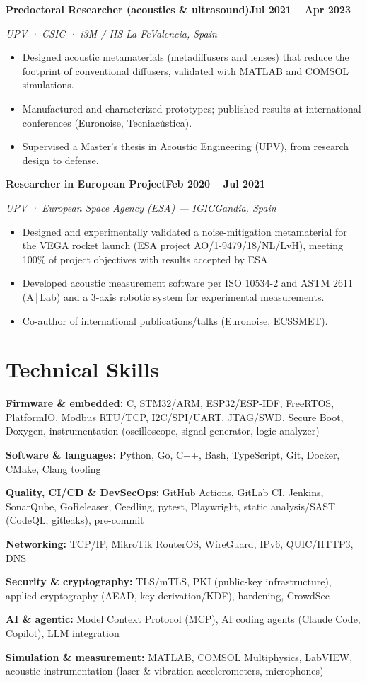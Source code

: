 \documentclass[11pt,a4paper]{article}
\let\jmrpsection\section
\renewcommand{\section}[1]{\needspace{4\baselineskip}\jmrpsection{#1}}
\newcommand{\cventry}[4]{%
  \textbf{#1}\hfill\textbf{#4}\par
  {\color{muted}\textit{#2}\hfill\textit{#3}}\par
  \vspace{2pt}
}
\newcommand{\cvskill}[2]{\textbf{#1:} #2\par\vspace{2pt}}
\begin{document}
\cventry{Predoctoral Researcher (acoustics \& ultrasound)}{UPV · CSIC · i3M / IIS La Fe}{Valencia, Spain}{Jul 2021 – Apr 2023}
\begin{itemize}
  \item Designed acoustic metamaterials (metadiffusers and lenses) that reduce the footprint of conventional diffusers, validated with MATLAB and COMSOL simulations.
  \item Manufactured and characterized prototypes; published results at international conferences (Euronoise, Tecniacústica).
  \item Supervised a Master's thesis in Acoustic Engineering (UPV), from research design to defense.
\end{itemize}\vspace{2pt}

\cventry{Researcher in European Project}{UPV · European Space Agency (ESA) — IGIC}{Gandía, Spain}{Feb 2020 – Jul 2021}
\begin{itemize}
  \item Designed and experimentally validated a noise-mitigation metamaterial for the VEGA rocket launch (ESA project AO/1-9479/18/NL/LvH), meeting 100\% of project objectives with results accepted by ESA.
  \item Developed acoustic measurement software per ISO 10534-2 and ASTM 2611 (\href{https://github.com/jmrplens/A-Lab}{A\,|\,Lab}) and a 3-axis robotic system for experimental measurements.
  \item Co-author of international publications/talks (Euronoise, ECSSMET).
\end{itemize}\vspace{2pt}

\section{Technical Skills}
\cvskill{Firmware \& embedded}{C, STM32/ARM, ESP32/ESP-IDF, FreeRTOS, PlatformIO, Modbus RTU/TCP, I2C/SPI/UART, JTAG/SWD, Secure Boot, Doxygen, instrumentation (oscilloscope, signal generator, logic analyzer)}
\cvskill{Software \& languages}{Python, Go, C++, Bash, TypeScript, Git, Docker, CMake, Clang tooling}
\cvskill{Quality, CI/CD \& DevSecOps}{GitHub Actions, GitLab CI, Jenkins, SonarQube, GoReleaser, Ceedling, pytest, Playwright, static analysis/SAST (CodeQL, gitleaks), pre-commit}
\cvskill{Networking}{TCP/IP, MikroTik RouterOS, WireGuard, IPv6, QUIC/HTTP3, DNS}
\cvskill{Security \& cryptography}{TLS/mTLS, PKI (public-key infrastructure), applied cryptography (AEAD, key derivation/KDF), hardening, CrowdSec}
\cvskill{AI \& agentic}{Model Context Protocol (MCP), AI coding agents (Claude Code, Copilot), LLM integration}
\cvskill{Simulation \& measurement}{MATLAB, COMSOL Multiphysics, LabVIEW, acoustic instrumentation (laser \& vibration accelerometers, microphones)}
\end{document}
